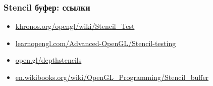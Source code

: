 \documentclass{beamer}
\begin{document}
\begin{frame}[fragile]
\frametitle{Stencil буфер: ссылки}
\begin{itemize}
\item \href{https://www.khronos.org/opengl/wiki/Stencil_Test}{khronos.org/opengl/wiki/Stencil\_Test}
\item \href{https://learnopengl.com/Advanced-OpenGL/Stencil-testing}{learnopengl.com/Advanced-OpenGL/Stencil-testing}
\item \href{https://open.gl/depthstencils}{open.gl/depthstencils}
\item \href{https://en.wikibooks.org/wiki/OpenGL_Programming/Stencil_buffer}{en.wikibooks.org/wiki/OpenGL\_Programming/Stencil\_buffer}
\end{itemize}
\end{frame}
\end{document}
